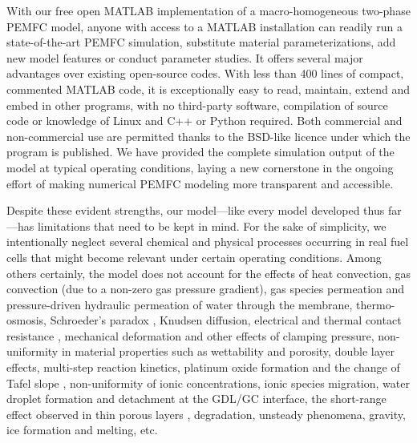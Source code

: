 \documentclass[fontsize=9pt,DIV=calc,a4paper,twocolumn]{scrartcl}
\begin{document}
With our free open MATLAB implementation of a macro-homogeneous two-phase PEMFC model, anyone with access to a MATLAB installation can readily run a state-of-the-art PEMFC simulation, substitute material parameterizations, add new model features or conduct parameter studies. It offers several major advantages over existing open-source codes. With less than 400 lines of compact, commented MATLAB code, it is exceptionally easy to read, maintain, extend and embed in other programs, with no third-party software, compilation of source code or knowledge of Linux and C++ or Python required. Both commercial and non-commercial use are permitted thanks to the BSD-like licence under which the program is published. We have provided the complete simulation output of the model at typical operating conditions, laying a new cornerstone in the ongoing effort of making numerical PEMFC modeling more transparent and accessible.

Despite these evident strengths, our model---like every model developed thus far---has limitations that need to be kept in mind. For the sake of simplicity, we intentionally neglect several chemical and physical processes occurring in real fuel cells that might become relevant under certain operating conditions. Among others certainly, the model does not account for the effects of heat convection, gas convection (due to a non-zero gas pressure gradient), gas species permeation and pressure-driven hydraulic permeation of water through the membrane, thermo-osmosis, Schroeder's paradox \cite{choi:03}, Knudsen diffusion, electrical and thermal contact resistance \cite{vetter:17}, mechanical deformation and other effects of clamping pressure, non-uniformity in material properties such as wettability and porosity, double layer effects, multi-step reaction kinetics, platinum oxide formation and the change of Tafel slope \cite{weber:14}, non-uniformity of ionic concentrations, ionic species migration, water droplet formation and detachment at the GDL/GC interface, the short-range effect observed in thin porous layers \cite{holzer:17a,holzer:17b}, degradation, unsteady phenomena, gravity, ice formation and melting, etc.
\end{document}

